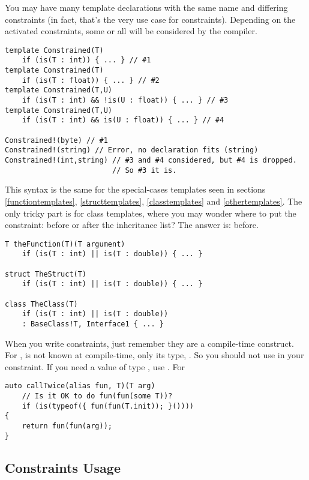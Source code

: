 You may have many template declarations with the same name and differing constraints (in fact, that's the very use case for constraints). Depending on the activated constraints, some or all will be considered by the compiler.

\begin{verbatim}
template Constrained(T) 
    if (is(T : int)) { ... } // #1
template Constrained(T) 
    if (is(T : float)) { ... } // #2
template Constrained(T,U) 
    if (is(T : int) && !is(U : float)) { ... } // #3
template Constrained(T,U) 
    if (is(T : int) && is(U : float)) { ... } // #4

Constrained!(byte) // #1
Constrained!(string) // Error, no declaration fits (string)
Constrained!(int,string) // #3 and #4 considered, but #4 is dropped.
                         // So #3 it is.
\end{verbatim}

This syntax is the same for the special-cases templates seen in sections \ref{functiontemplates}, \ref{structtemplates}, \ref{classtemplates} and \ref{othertemplates}. The only tricky part is for class templates, where you may wonder where to put the constraint: before or after the inheritance list? The answer is: before.

\begin{verbatim}
T theFunction(T)(T argument)
    if (is(T : int) || is(T : double)) { ... }

struct TheStruct(T) 
    if (is(T : int) || is(T : double)) { ... }

class TheClass(T) 
    if (is(T : int) || is(T : double)) 
    : BaseClass!T, Interface1 { ... }
\end{verbatim}

When you write constraints, just remember they are a compile-time construct. For ,  is not known at compile-time, only its type, . So you should not use  in your constraint. If you need a value of type , use . For 

\begin{verbatim}
auto callTwice(alias fun, T)(T arg)
    // Is it OK to do fun(fun(some T))?
    if (is(typeof({ fun(fun(T.init)); }()))) 
{
    return fun(fun(arg));
}
\end{verbatim}

\subsection{Constraints Usage}\label{constraintsusage}

